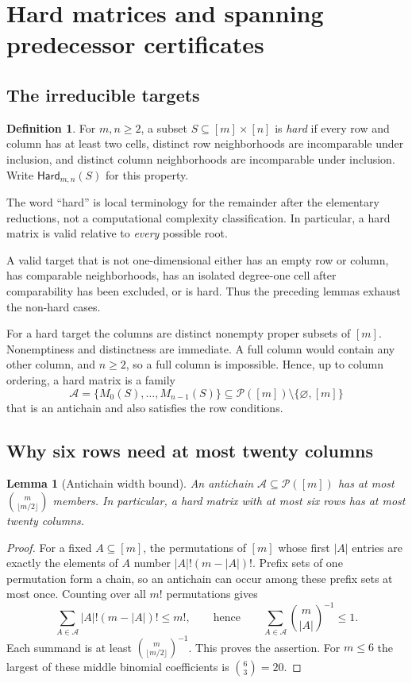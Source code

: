 \documentclass[11pt,letterpaper]{article}
\numberwithin{equation}{section}
\newtheorem{lemma}[theorem]{Lemma}
\theoremstyle{definition}
\newtheorem{definition}[theorem]{Definition}
\theoremstyle{remark}
\newcommand{\Hard}{\mathsf{Hard}}
\newcommand{\Pow}{\mathcal{P}}
\begin{document}
\section{Hard matrices and spanning predecessor certificates}
\label{sec:hard}

\subsection{The irreducible targets}
\begin{definition}\label{def:hard}
For $m,n\ge2$, a subset $S\subseteq[m]\times[n]$ is \emph{hard} if every
row and column has at least two cells, distinct row neighborhoods are
incomparable under inclusion, and distinct column neighborhoods are
incomparable under inclusion. Write $\Hard_{m,n}(S)$ for this property.
\end{definition}

The word ``hard'' is local terminology for the remainder after the elementary
reductions, not a computational complexity classification. In particular,
a hard matrix is valid relative to \emph{every} possible root.

A valid target that is not one-dimensional either has an empty row or
column, has comparable neighborhoods, has an isolated degree-one cell
after comparability has been excluded, or is hard. Thus the preceding
lemmas exhaust the non-hard cases.

For a hard target the columns are distinct nonempty proper subsets of
$[m]$. Nonemptiness and distinctness are immediate. A full column would
contain any other column, and $n\ge2$, so a full column is impossible.
Hence, up to column ordering, a hard matrix is a family
\[
 \mathcal A=\{M_0(S),\ldots,M_{n-1}(S)\}
 \subseteq\Pow([m])\setminus\{\varnothing,[m]\}
\]
that is an antichain and also satisfies the row conditions.

\subsection{Why six rows need at most twenty columns}
\begin{lemma}[Antichain width bound]\label{lem:sperner}
An antichain $\mathcal A\subseteq\Pow([m])$ has at most
$\binom{m}{\lfloor m/2\rfloor}$ members. In particular, a hard matrix with
at most six rows has at most twenty columns.
\end{lemma}
\begin{proof}
For a fixed $A\subseteq[m]$, the permutations of $[m]$ whose first $|A|$
entries are exactly the elements of $A$ number $|A|!(m-|A|)!$. Prefix sets
of one permutation form a chain, so an antichain can occur among these
prefix sets at most once. Counting over all $m!$ permutations gives
\[
 \sum_{A\in\mathcal A}|A|!(m-|A|)!\le m!,
 \qquad\text{hence}\qquad
 \sum_{A\in\mathcal A}\binom{m}{|A|}^{-1}\le1.
\]
Each summand is at least $\binom{m}{\lfloor m/2\rfloor}^{-1}$. This proves
the assertion. For $m\le6$ the largest of these middle binomial
coefficients is $\binom63=20$.
\end{proof}
\end{document}
